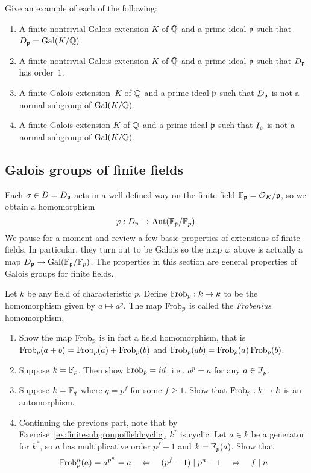 \begin{exercise}
	Give an example of each of the following:
	\begin{enumerate}
		\item A finite nontrivial Galois extension $K$
		of $\mathbb{Q}$ and a prime ideal $\mathfrak{p}$ such that $D_{\mathfrak{p}} = \operatorname{Gal}(K/\mathbb{Q})$.
		\item A finite nontrivial Galois extension $K$ of
		$\mathbb{Q}$ and a prime ideal $\mathfrak{p}$ such that $D_{\mathfrak{p}}$ has order~$1$.
		\item A finite Galois extension~$K$ of
		$\mathbb{Q}$ and a prime ideal $\mathfrak{p}$ such that $D_{\mathfrak{p}}$ is not a normal
		subgroup of $\operatorname{Gal}(K/\mathbb{Q})$.
		\item A finite Galois extension $K$ of
		$\mathbb{Q}$ and a prime ideal $\mathfrak{p}$ such that $I_{\mathfrak{p}}$ is not a normal
		subgroup of $\operatorname{Gal}(K/\mathbb{Q})$.
	\end{enumerate}
\end{exercise}

\subsection{Galois groups of finite fields}\label{sec:galoisfinite}

Each $\sigma \in D = D_{\mathfrak{p}}$ acts in a well-defined
way on the finite field $\mathbb{F}_{\mathfrak{p}} = \mathcal{O}_K/\mathfrak{p}$, so we obtain
a homomorphism
$$
	\varphi:D_{\mathfrak{p}} \to \operatorname{Aut}(\mathbb{F}_{\mathfrak{p}}/\mathbb{F}_p).
$$
We pause for a moment and review a few basic properties of
extensions of finite fields. In particular, they turn out
to be Galois so the map $\varphi$ above is actually a map
$D_{\mathfrak{p}} \to \operatorname{Gal}(\mathbb{F}_{\mathfrak{p}}/\mathbb{F}_p)$.
The properties in this section are general properties
of Galois groups for finite fields.

\begin{definition}
	Let $k$ be any field of characteristic $p$.
	Define $\operatorname{Frob}_p:k\to k$ to be the homomorphism
	given by $a\mapsto a^p$. The map $\operatorname{Frob}_p$ is
	called the \emph{Frobenius} homomorphism.
\end{definition}

\begin{exercise}\label{ex:frob}
	\hfill
	\begin{enumerate}
		\item
		Show the map $\operatorname{Frob}_p$ is in fact a field homomorphism,
		that is $\operatorname{Frob}_p(a + b) = \operatorname{Frob}_p(a) + \operatorname{Frob}_p(b)$
		and $\operatorname{Frob}_p(ab) = \operatorname{Frob}_p(a)\operatorname{Frob}_p(b)$.

		\item
		Suppose $k = \mathbb{F}_p$. Then show $\operatorname{Frob}_p = id$, i.e.,
		$a^p = a$ for any $a\in\mathbb{F}_p$.

		\item
		Suppose $k = \mathbb{F}_{q}$ where $q=p^f$ for some $f\geq 1$.
		Show that $\operatorname{Frob}_p:k\to k$ is an automorphism.

		\item
		Continuing the previous part, note that by
		Exercise~\ref{ex:finitesubgroupoffieldcyclic}, $k^*$ is cyclic.
		Let $a\in k$ be a generator for $k^*$,
		so $a$ has multiplicative order $p^f-1$ and $k = \mathbb{F}_p(a)$.
		Show that
		$$
			\operatorname{Frob}_p^n(a) = a^{p^n} = a
			\quad\Leftrightarrow\quad (p^f - 1) \mid p^n - 1
			\quad\Leftrightarrow\quad f \mid n
		$$
	\end{enumerate}
\end{exercise}

